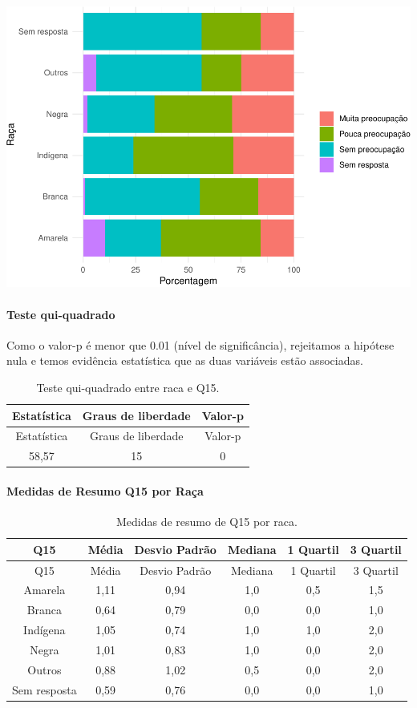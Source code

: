 \documentclass[]{article}
\let\oldparagraph\paragraph
\renewcommand{\paragraph}[1]{\oldparagraph{#1}\mbox{}}
\begin{document}
\begin{center}\includegraphics[width=0.75\linewidth]{relatorio_covid19_files/figure-latex/unnamed-chunk-103-1} \end{center}

\hypertarget{teste-qui-quadrado-10}{%
\paragraph{Teste qui-quadrado}\label{teste-qui-quadrado-10}}

Como o valor-p é menor que 0.01 (nível de significância), rejeitamos a hipótese nula e temos evidência estatística que as duas variáveis estão associadas.

\begin{longtable}[]{@{}ccc@{}}
\caption{\label{tab:unnamed-chunk-105}Teste qui-quadrado entre raca e Q15.}\tabularnewline
\toprule
Estatística & Graus de liberdade & Valor-p\tabularnewline
\midrule
\endfirsthead
\toprule
Estatística & Graus de liberdade & Valor-p\tabularnewline
\midrule
\endhead
58,57 & 15 & 0\tabularnewline
\bottomrule
\end{longtable}

\cleardoublepage

\hypertarget{medidas-de-resumo-q15-por-rauxe7a}{%
\paragraph{Medidas de Resumo Q15 por Raça}\label{medidas-de-resumo-q15-por-rauxe7a}}

\begin{longtable}[]{@{}cccccc@{}}
\caption{\label{tab:unnamed-chunk-106}Medidas de resumo de Q15 por raca.}\tabularnewline
\toprule
Q15 & Média & Desvio Padrão & Mediana & 1 Quartil & 3 Quartil\tabularnewline
\midrule
\endfirsthead
\toprule
Q15 & Média & Desvio Padrão & Mediana & 1 Quartil & 3 Quartil\tabularnewline
\midrule
\endhead
Amarela & 1,11 & 0,94 & 1,0 & 0,5 & 1,5\tabularnewline
Branca & 0,64 & 0,79 & 0,0 & 0,0 & 1,0\tabularnewline
Indígena & 1,05 & 0,74 & 1,0 & 1,0 & 2,0\tabularnewline
Negra & 1,01 & 0,83 & 1,0 & 0,0 & 2,0\tabularnewline
Outros & 0,88 & 1,02 & 0,5 & 0,0 & 2,0\tabularnewline
Sem resposta & 0,59 & 0,76 & 0,0 & 0,0 & 1,0\tabularnewline
\bottomrule
\end{longtable}
\end{document}
